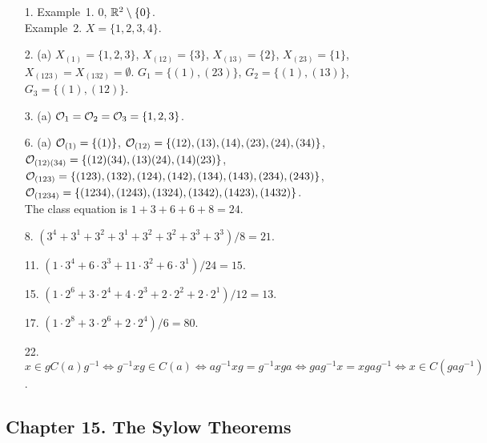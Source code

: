 {\small
\begin{itemize}
 
\item[1.] 
Example~1. $0$, ${\Bbb R}^2 \setminus \{ 0 \}$. \\
Example~2. $X = \{ 1, 2, 3, 4 \}$.
 
\item[2.]
(a) $X_{(1)} = \{1, 2, 3  \}$, $X_{(12)} = \{3 \}$, $X_{(13)}=
\{ 2 \}$, $X_{(23)} = \{1 \}$, $X_{(123)} = X_{(132)} = \emptyset$.
$G_1 = \{ (1), (23) \}$, $G_2 = \{(1), (13) \}$, $G_3 = \{ (1),
(12)\}$.
 
\item[3.]
(a) 
${\cal O}_1 = {\cal O}_2 = {\cal O}_3 = \{ 1, 2, 3\}$.
 
 
\item[6.]
(a)
${\cal O}_{(1)} = \{ (1) \}$, 
${\cal O}_{(12)} = \{ (12), (13), (14), (23), (24), (34) \}$, \\
${\cal O}_{(12)(34)} = \{ (12)(34), (13)(24), (14)(23) \}$, \\
${\cal O}_{(123)} = \{ (123), (132), (124), (142), (134), (143),
(234), (243) \}$,  \\
${\cal O}_{(1234)} = \{ (1234), (1243), (1324), (1342), (1423), (1432)
\}$. \\
The class equation is $1 + 3 + 6 + 6 + 8 = 24$.
 
\item[8.]
$(3^4 + 3^1 + 3^2 + 3^1 + 3^2 + 3^2 + 3^3 + 3^3)/8 = 21$.
 
\item[11.]
$(1 \cdot 3^4 + 6 \cdot 3^3 + 11 \cdot 3^2 + 6 \cdot 3^1)/24 = 15$.
 
\item[15.]
$(1 \cdot 2^6 + 3 \cdot 2^4 + 4 \cdot 2^3 + 2 \cdot 2^2 
+ 2 \cdot 2^1)/12 = 13$.
 
\item[17.]
$(1 \cdot 2^8 + 3 \cdot 2^6 + 2 \cdot 2^4)/6 = 80$.
 
 
\item[22.]
$x \in g C(a) g^{-1} \Leftrightarrow g^{-1}x g \in C(a) \Leftrightarrow
a g^{-1} x g = g^{-1} x g a \Leftrightarrow g a g^{-1} x = x g a
g^{-1} \Leftrightarrow x \in C(gag^{-1})$. 
 
\end{itemize}
}
 
\subsection*{Chapter 15. The Sylow Theorems}
 
